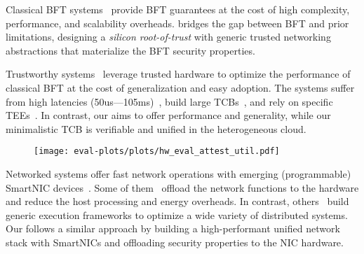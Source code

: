  Classical BFT systems~\cite{Castro:2002, Suri_Payer_2021, DBLP:journals/corr/abs-1803-05069, Chan2018PaLaAS, DBLP:journals/corr/abs-1807-04938, Chan2018PiLiAE, bft-smart, 6681599} provide BFT guarantees at the cost of high complexity, performance, and scalability overheads. \projecttitle{} bridges the gap between BFT and prior limitations, designing a {\em silicon root-of-trust} with generic trusted networking abstractions that materialize the BFT security properties.

 Trustworthy systems~\cite{10.1145/3492321.3519568, minBFT, 10.1145/3552326.3587455, 10.1145/3492321.3519568, treaty, avocado, ccf} leverage trusted hardware to optimize the performance of classical BFT at the cost of generalization and easy adoption. The systems suffer from high latencies (50us---105ms)~\cite{levin2009trinc, 10.1145/2168836.2168866}, build large TCBs~\cite{treaty, avocado}, and rely on specific TEEs~\cite{minBFT, hybster}. In contrast, our \projecttitle{} aims to offer performance and generality, while our minimalistic TCB is verifiable and unified in the heterogeneous cloud. 

\begin{figure}
    \centering
    \texttt{[image: eval-plots/plots/hw\_eval\_attest\_util.pdf]}
    \vspace{-20pt}
  \caption{ }
    \label{fig:scalability}
\end{figure}

 Networked systems offer fast network operations with emerging (programmable) SmartNIC devices~\cite{liquidIO_smartnics, u280_smartnics, bluefield_smartnics, broadcom_smartnics, netronome_smartnics, alibaba_smartnics, nitro_smartnics, msr_smartnics}. Some of them~\cite{246498, 211249, 10.1145/3387514.3405895, 10.1145/3365609.3365851, 10.1145/3127479.3132252,  258971, 246486, 179716, 227655, 10.1145/3286062.3286068, shan2022supernic, 10.1145/3390251.3390257} offload the network functions to the hardware and reduce the host processing and energy overheads. In contrast, others~\cite{10.1145/3341302.3342079, 10.1145/2872362.2872367, 234944, 9220629, 6853195, 10292786, 10.1145/3477132.3483555, 280678, 10.1145/3132747.3132756, honeycomb, 288659, 10329593} build generic execution frameworks to optimize a wide variety of distributed systems. Our \projecttitle{} follows a similar approach by building a high-performant unified network stack with SmartNICs and offloading security properties to the NIC hardware.


